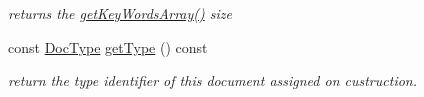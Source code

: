 \begin{DoxyCompactItemize}
\begin{DoxyCompactList}\small\item\em returns the \hyperlink{classdocs_1_1Document_a9b7139734ec394970161695e2e06c263}{get\-Key\-Words\-Array()} size \end{DoxyCompactList}\item 
\hypertarget{classdocs_1_1Document_a5626bdb2863afb9c3dd363fc5cc1bbde}{const \hyperlink{classdocs_1_1DocType}{Doc\-Type} \hyperlink{classdocs_1_1Document_a5626bdb2863afb9c3dd363fc5cc1bbde}{get\-Type} () const }\label{classdocs_1_1Document_a5626bdb2863afb9c3dd363fc5cc1bbde}

\begin{DoxyCompactList}\small\item\em return the type identifier of this document assigned on custruction. \end{DoxyCompactList}\end{DoxyCompactItemize}
